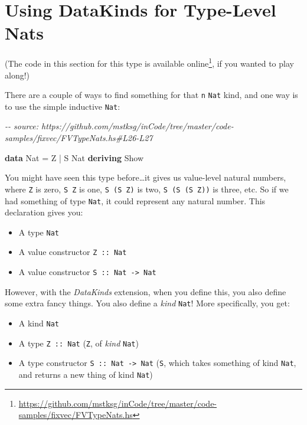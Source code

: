 \documentclass[]{article}
\newenvironment{Shaded}{}{}
\newcommand{\CommentTok}[1]{\textcolor[rgb]{0.38,0.63,0.69}{\textit{#1}}}
\newcommand{\DataTypeTok}[1]{\textcolor[rgb]{0.56,0.13,0.00}{#1}}
\newcommand{\KeywordTok}[1]{\textcolor[rgb]{0.00,0.44,0.13}{\textbf{#1}}}
\newcommand{\OperatorTok}[1]{\textcolor[rgb]{0.40,0.40,0.40}{#1}}
\newcommand{\OtherTok}[1]{\textcolor[rgb]{0.00,0.44,0.13}{#1}}
\renewcommand{\href}[2]{#2\footnote{\url{#1}}}
\begin{document}
\section{Using DataKinds for Type-Level
Nats}\label{using-datakinds-for-type-level-nats}

(The code in this section for this type is
\href{https://github.com/mstksg/inCode/tree/master/code-samples/fixvec/FVTypeNats.hs}{available
online}, if you wanted to play along!)

There are a couple of ways to find something for that \texttt{n} \texttt{Nat}
kind, and one way is to use the simple inductive \texttt{Nat}:

\begin{Shaded}
\begin{Highlighting}[]
\CommentTok{{-}{-} source: https://github.com/mstksg/inCode/tree/master/code{-}samples/fixvec/FVTypeNats.hs\#L26{-}L27}

\KeywordTok{data} \DataTypeTok{Nat} \OtherTok{=} \DataTypeTok{Z} \OperatorTok{|} \DataTypeTok{S} \DataTypeTok{Nat}
         \KeywordTok{deriving} \DataTypeTok{Show}
\end{Highlighting}
\end{Shaded}

You might have seen this type before\ldots it gives us value-level natural
numbers, where \texttt{Z} is zero, \texttt{S\ Z} is one, \texttt{S\ (S\ Z)} is
two, \texttt{S\ (S\ (S\ Z))} is three, etc. So if we had something of type
\texttt{Nat}, it could represent any natural number. This declaration gives you:

\begin{itemize}
\tightlist
\item
  A type \texttt{Nat}
\item
  A value constructor \texttt{Z\ ::\ Nat}
\item
  A value constructor \texttt{S\ ::\ Nat\ -\textgreater{}\ Nat}
\end{itemize}

However, with the \emph{DataKinds} extension, when you define this, you also
define some extra fancy things. You also define a \emph{kind} \texttt{Nat}! More
specifically, you get:

\begin{itemize}
\tightlist
\item
  A kind \texttt{Nat}
\item
  A type \texttt{Z\ ::\ Nat} (\texttt{Z}, of \emph{kind} \texttt{Nat})
\item
  A type constructor \texttt{S\ ::\ Nat\ -\textgreater{}\ Nat} (\texttt{S},
  which takes something of kind \texttt{Nat}, and returns a new thing of kind
  \texttt{Nat})
\end{itemize}
\end{document}
